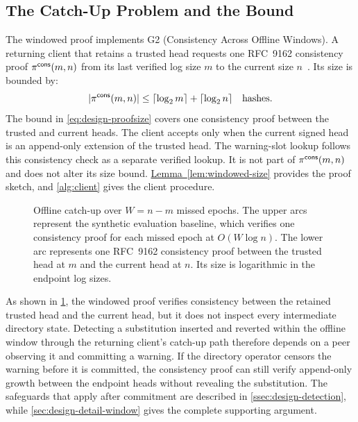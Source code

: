 \subsection{The Catch-Up Problem and the Bound}\label{ssec:design-catchup}

The windowed proof implements G2 (Consistency Across Offline Windows). A returning client that
retains a trusted head requests one RFC~9162 consistency proof $\pi^{\mathsf{cons}}(m,n)$ from its last verified
log size $m$ to the current size $n$~\cite[Section~2.1.4]{rfc9162}. Its size is bounded by:
\begin{equation}\label{eq:design-proofsize}
  |\pi^{\mathsf{cons}}(m, n)| \le \lceil \log_2 m \rceil + \lceil \log_2 n \rceil
  \quad\text{hashes}.
\end{equation}
The bound in \cref{eq:design-proofsize} covers one consistency proof between the trusted and current
heads. The client accepts only when the current signed head is an append-only extension of the
trusted head. The warning-slot lookup follows this consistency check as a separate verified lookup.
It is not part of $\pi^{\mathsf{cons}}(m,n)$ and does not alter its size bound.
\hyperref[lem:windowed-size]{Lemma~\ref*{lem:windowed-size}} provides the proof sketch, and \cref{alg:client} gives the client procedure.

\begin{figure}[H]
\centering

\caption[Windowed offline catch-up.]{Offline catch-up over $W=n-m$ missed epochs. The upper arcs
represent the synthetic evaluation baseline, which verifies one consistency proof for each missed
epoch at $O(W\log n)$. The lower arc represents one RFC~9162 consistency proof between the trusted
head at $m$ and the current head at $n$. Its size is logarithmic in
the endpoint log sizes.}
\label{fig:design-windowed}
\end{figure}

As shown in \cref{fig:design-windowed}, the windowed proof verifies consistency between the retained
trusted head and the current head, but it does not inspect every intermediate directory state.
Detecting a substitution inserted and reverted within the offline window through the returning
client's catch-up path therefore depends on a peer observing it and committing a warning. If the
directory operator censors the warning before it is committed, the consistency proof can still
verify append-only growth between the endpoint heads without revealing the substitution. The
safeguards that apply after commitment are described in \cref{ssec:design-detection}, while
\cref{sec:design-detail-window} gives the complete supporting argument.


